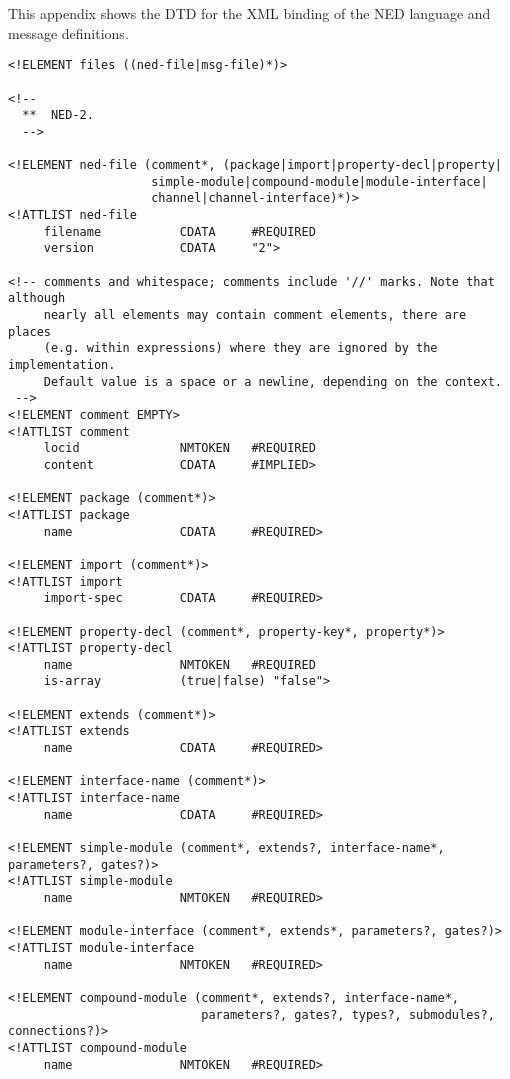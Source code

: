 \label{cha:ned-xml-binding}

This appendix shows the DTD for the XML binding of the NED language and
message definitions.

\begin{verbatim}
<!ELEMENT files ((ned-file|msg-file)*)>

<!--
  **  NED-2.
  -->

<!ELEMENT ned-file (comment*, (package|import|property-decl|property|
                    simple-module|compound-module|module-interface|
                    channel|channel-interface)*)>
<!ATTLIST ned-file
     filename           CDATA     #REQUIRED
     version            CDATA     "2">

<!-- comments and whitespace; comments include '//' marks. Note that although
     nearly all elements may contain comment elements, there are places
     (e.g. within expressions) where they are ignored by the implementation.
     Default value is a space or a newline, depending on the context.
 -->
<!ELEMENT comment EMPTY>
<!ATTLIST comment
     locid              NMTOKEN   #REQUIRED
     content            CDATA     #IMPLIED>

<!ELEMENT package (comment*)>
<!ATTLIST package
     name               CDATA     #REQUIRED>

<!ELEMENT import (comment*)>
<!ATTLIST import
     import-spec        CDATA     #REQUIRED>

<!ELEMENT property-decl (comment*, property-key*, property*)>
<!ATTLIST property-decl
     name               NMTOKEN   #REQUIRED
     is-array           (true|false) "false">

<!ELEMENT extends (comment*)>
<!ATTLIST extends
     name               CDATA     #REQUIRED>

<!ELEMENT interface-name (comment*)>
<!ATTLIST interface-name
     name               CDATA     #REQUIRED>

<!ELEMENT simple-module (comment*, extends?, interface-name*, parameters?, gates?)>
<!ATTLIST simple-module
     name               NMTOKEN   #REQUIRED>

<!ELEMENT module-interface (comment*, extends*, parameters?, gates?)>
<!ATTLIST module-interface
     name               NMTOKEN   #REQUIRED>

<!ELEMENT compound-module (comment*, extends?, interface-name*,
                           parameters?, gates?, types?, submodules?, connections?)>
<!ATTLIST compound-module
     name               NMTOKEN   #REQUIRED>


\end{verbatim}
